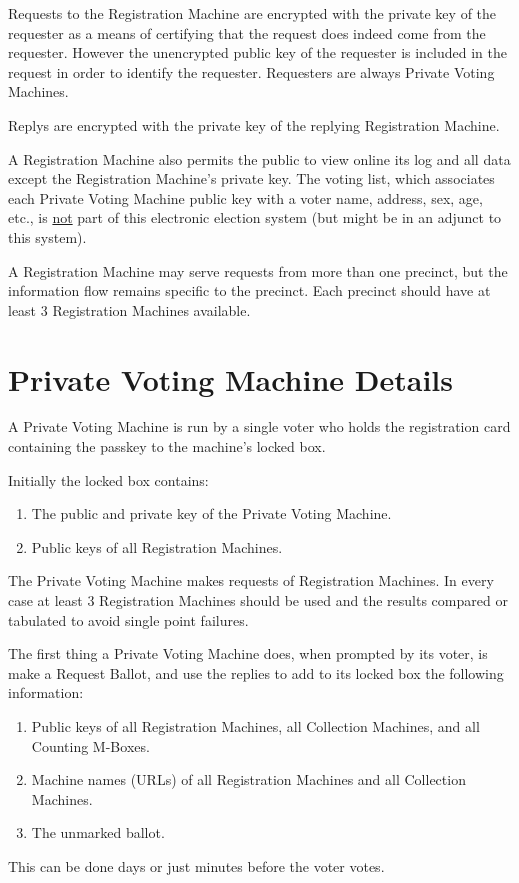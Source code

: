 \documentclass[12pt]{article}
\begin{document}
Requests to the Registration Machine are encrypted with the
private key of the requester as a means of certifying that
the request does indeed come from the requester.  However the
unencrypted public key of the requester is included in the
request in order to identify the requester.  Requesters are
always Private Voting Machines.

Replys are encrypted with the private key of the replying Registration Machine.

A Registration Machine also permits the public to view online
its log and all data except the Registration Machine's
private key.  The voting list, which associates each Private
Voting Machine public key with a voter name, address, sex,
age, etc., is \underline{not} part of this electronic
election system (but might be in an adjunct to this system).

A Registration Machine may serve requests from more than
one precinct, but the information flow remains specific
to the precinct.  Each precinct should have at least 3
Registration Machines available.

\section{Private Voting Machine Details}

A Private Voting Machine is run by a single voter
who holds the registration card containing the passkey to
the machine's locked box.

Initially the locked box contains:
\begin{enumerate}
\item The public and private key of the Private Voting Machine.
\item Public keys of all Registration Machines.
\setcounter{PVM-COUNTER}{\value{enumi}}
\end{enumerate}

The Private Voting Machine
makes requests of Registration Machines.  In every case
at least 3 Registration Machines should be used and the
results compared or tabulated to avoid single point failures.

The first thing a Private Voting Machine does, when prompted by
its voter, is make a Request Ballot, and use the replies to
add to its locked box the following information:
\begin{enumerate}
\setcounter{enumi}{\value{PVM-COUNTER}}
\item Public keys of all Registration Machines, all Collection
Machines, and all Counting M-Boxes.
\item Machine names (URLs) of all Registration Machines and all Collection
Machines.
\item The unmarked ballot.
\end{enumerate}
This can be done days or just minutes before the voter votes.
\end{document}
